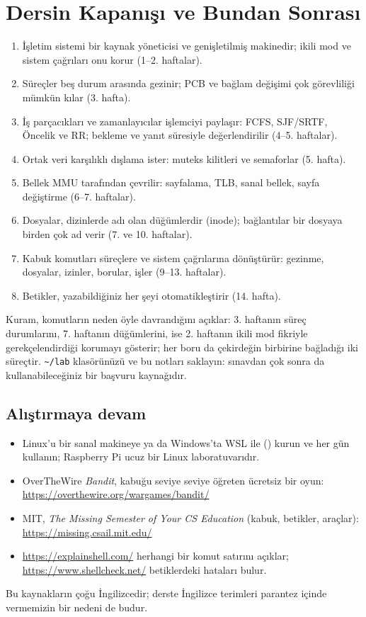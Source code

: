 \section{Dersin Kapanışı ve Bundan Sonrası}

\begin{keyidea}
\begin{enumerate}[leftmargin=1.4em]
  \item İşletim sistemi bir kaynak yöneticisi ve genişletilmiş makinedir; ikili mod ve sistem çağrıları onu korur (1--2. haftalar).
  \item Süreçler beş durum arasında gezinir; PCB ve bağlam değişimi çok görevliliği mümkün kılar (3. hafta).
  \item İş parçacıkları ve zamanlayıcılar işlemciyi paylaşır: FCFS, SJF/SRTF, Öncelik ve RR; bekleme ve yanıt süresiyle değerlendirilir (4--5. haftalar).
  \item Ortak veri karşılıklı dışlama ister: muteks kilitleri ve semaforlar (5. hafta).
  \item Bellek MMU tarafından çevrilir: sayfalama, TLB, sanal bellek, sayfa değiştirme (6--7. haftalar).
  \item Dosyalar, dizinlerde adı olan düğümlerdir (inode); bağlantılar bir dosyaya birden çok ad verir (7. ve 10. haftalar).
  \item Kabuk komutları süreçlere ve sistem çağrılarına dönüştürür: gezinme, dosyalar, izinler, borular, işler (9--13. haftalar).
  \item Betikler, yazabildiğiniz her şeyi otomatikleştirir (14. hafta).
\end{enumerate}
\end{keyidea}

Kuram, komutların neden öyle davrandığını açıklar:  3. haftanın süreç durumlarını,  7. haftanın düğümlerini,  ise 2. haftanın ikili mod fikriyle gerekçelendirdiği korumayı gösterir; her boru da çekirdeğin birbirine bağladığı iki süreçtir. \texttt{\textasciitilde/lab} klasörünüzü ve bu notları saklayın: sınavdan çok sonra da kullanabileceğiniz bir başvuru kaynağıdır.

\subsection*{Alıştırmaya devam}
\begin{itemize}
  \item Linux'u bir sanal makineye ya da Windows'ta WSL ile () kurun ve her gün kullanın; Raspberry Pi ucuz bir Linux laboratuvarıdır.
  \item OverTheWire \emph{Bandit}, kabuğu seviye seviye öğreten ücretsiz bir oyun: \url{https://overthewire.org/wargames/bandit/}
  \item MIT, \emph{The Missing Semester of Your CS Education} (kabuk, betikler, araçlar): \url{https://missing.csail.mit.edu/}
  \item \url{https://explainshell.com/} herhangi bir komut satırını açıklar; \url{https://www.shellcheck.net/} betiklerdeki hataları bulur.
\end{itemize}
Bu kaynakların çoğu İngilizcedir; derste İngilizce terimleri parantez içinde vermemizin bir nedeni de budur.

